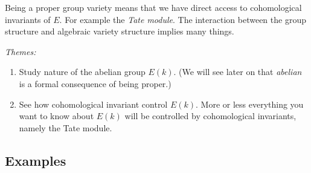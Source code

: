 Being a proper group variety means that we have direct access to cohomological invariants of \( E \).
For example the \textit{Tate module}.
The interaction between the group structure and algebraic variety structure implies many things.

\textit{Themes:}
\begin{enumerate}
\item Study nature of the abelian group \( E(k) \). (We will see later on that \textit{abelian} is a formal consequence of being proper.)
\item See how cohomological invariant control \( E(k) \). More or less everything you want to know about \( E(k) \) will be controlled by cohomological invariants, namely the Tate module.
\end{enumerate}

\subsection{Examples}
